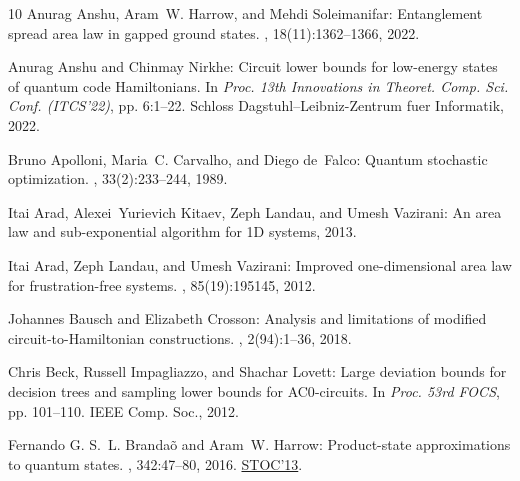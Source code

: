 \documentclass[11pt]{article}
\begin{document}
\begin{thebibliography}{10}
{\sc Anurag Anshu, Aram~W. Harrow, and Mehdi Soleimanifar}: Entanglement spread
  area law in gapped ground states.
, 18(11):1362--1366, 2022.

{\sc Anurag Anshu and Chinmay Nirkhe}: Circuit lower bounds for low-energy
  states of quantum code {H}amiltonians.
\newblock In {\em Proc. 13th Innovations in Theoret. Comp. Sci. Conf.
  (ITCS'22)}, pp. 6:1--22. Schloss Dagstuhl--Leibniz-Zentrum fuer Informatik,
  2022.

{\sc Bruno Apolloni, Maria~C. Carvalho, and Diego de~Falco}: Quantum stochastic
  optimization.
, 33(2):233--244, 1989.
\newblock [\epfmtdoi{10.1016/0304-4149(89)90040-9}]

{\sc Itai Arad, Alexei~Yurievich Kitaev, Zeph Landau, and Umesh Vazirani}: An
  area law and sub-exponential algorithm for {1D} systems, 2013.

{\sc Itai Arad, Zeph Landau, and Umesh Vazirani}: Improved one-dimensional area
  law for frustration-free systems.
, 85(19):195145, 2012.

{\sc Johannes Bausch and Elizabeth Crosson}: Analysis and limitations of
  modified circuit-to-{H}amiltonian constructions.
, 2(94):1--36, 2018.
\newblock [\epfmtdoi{10.22331/q-2018-09-19-94}]

{\sc Chris Beck, Russell Impagliazzo, and Shachar Lovett}: Large deviation
  bounds for decision trees and sampling lower bounds for {AC0}-circuits.
\newblock In {\em Proc. 53rd FOCS}, pp. 101--110. IEEE Comp. Soc., 2012.

{\sc Fernando G. S.~L. Branda{\~o} and Aram~W. Harrow}: Product-state
  approximations to quantum states.
, 342:47--80, 2016.
\newblock \prelim \href{https://doi.org/10.1145/2488608.2488719}{STOC'13}.
\newblock [\epfmtdoi{10.1007/s00220-016-2575-1}]


\end{thebibliography}
\end{document}
